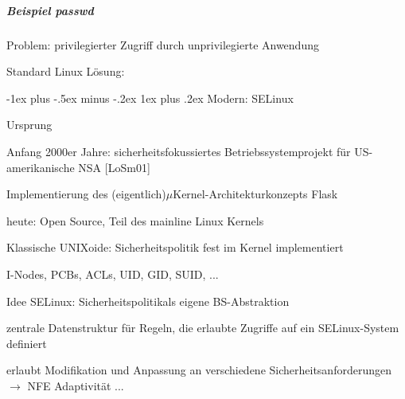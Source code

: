 \documentclass[a4paper]{article}
\makeatletter
\renewcommand{\subsubsection}{\@startsection{subsubsection}{3}{0mm}%
 {-1ex plus -.5ex minus -.2ex}%
 {1ex plus .2ex}%
 {\normalfont\small\bfseries}}
\makeatother
\begin{document}
\begin{multicols}{3}
    \subparagraph{Beispiel passwd}

    \begin{itemize*}
        \item
        Problem: privilegierter Zugriff durch unprivilegierte Anwendung
        \item
        Standard Linux Lösung:
    \end{itemize*}

    \subsubsection{Modern: SELinux}

    \begin{itemize*}
        \item
        Ursprung
        \begin{itemize*}
            \item Anfang 2000er Jahre: sicherheitsfokussiertes Betriebssystemprojekt für US-amerikanische NSA {[}LoSm01{]}
            \item Implementierung des (eigentlich)$\mu$Kernel-Architekturkonzepts Flask
            \item heute: Open Source, Teil des mainline Linux Kernels
        \end{itemize*}
        \item
        Klassische UNIXoide: Sicherheitspolitik fest im Kernel implementiert
        \begin{itemize*}
            \item I-Nodes, PCBs, ACLs, UID, GID, SUID, ...
        \end{itemize*}
        \item
        Idee SELinux: Sicherheitspolitikals eigene BS-Abstraktion
        \begin{itemize*}
            \item zentrale Datenstruktur für Regeln, die erlaubte Zugriffe auf ein SELinux-System definiert
            \item erlaubt Modifikation und Anpassung an verschiedene Sicherheitsanforderungen $\rightarrow$  NFE Adaptivität ...
        \end{itemize*}
    \end{itemize*}



\end{multicols}
\end{document}
